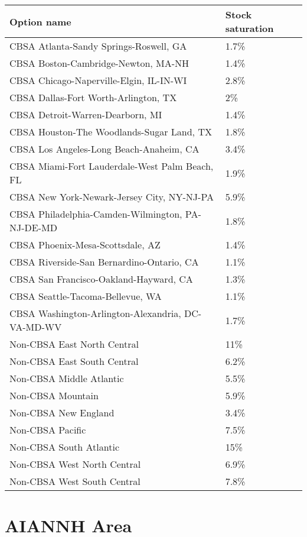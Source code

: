 \begin{longtable}[]{@{}ll@{}}
\toprule\noalign{}
Option name & Stock saturation \\
\midrule\noalign{}
\endhead
\bottomrule\noalign{}
\endlastfoot
CBSA Atlanta-Sandy Springs-Roswell, GA & 1.7\% \\
CBSA Boston-Cambridge-Newton, MA-NH & 1.4\% \\
CBSA Chicago-Naperville-Elgin, IL-IN-WI & 2.8\% \\
CBSA Dallas-Fort Worth-Arlington, TX & 2\% \\
CBSA Detroit-Warren-Dearborn, MI & 1.4\% \\
CBSA Houston-The Woodlands-Sugar Land, TX & 1.8\% \\
CBSA Los Angeles-Long Beach-Anaheim, CA & 3.4\% \\
CBSA Miami-Fort Lauderdale-West Palm Beach, FL & 1.9\% \\
CBSA New York-Newark-Jersey City, NY-NJ-PA & 5.9\% \\
CBSA Philadelphia-Camden-Wilmington, PA-NJ-DE-MD & 1.8\% \\
CBSA Phoenix-Mesa-Scottsdale, AZ & 1.4\% \\
CBSA Riverside-San Bernardino-Ontario, CA & 1.1\% \\
CBSA San Francisco-Oakland-Hayward, CA & 1.3\% \\
CBSA Seattle-Tacoma-Bellevue, WA & 1.1\% \\
CBSA Washington-Arlington-Alexandria, DC-VA-MD-WV & 1.7\% \\
Non-CBSA East North Central & 11\% \\
Non-CBSA East South Central & 6.2\% \\
Non-CBSA Middle Atlantic & 5.5\% \\
Non-CBSA Mountain & 5.9\% \\
Non-CBSA New England & 3.4\% \\
Non-CBSA Pacific & 7.5\% \\
Non-CBSA South Atlantic & 15\% \\
Non-CBSA West North Central & 6.9\% \\
Non-CBSA West South Central & 7.8\% \\
\end{longtable}

\section{AIANNH Area}\label{aiannh_area}

